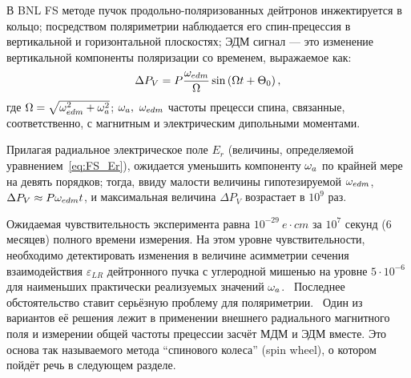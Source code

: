 В BNL FS методе пучок продольно-поляризованных
дейтронов инжектируется в кольцо; посредством поляриметрии наблюдается
его спин-прецессия в вертикальной и горизонтальной плоскостях; ЭДМ
сигнал --- это изменение вертикальной компоненты поляризации со
временем, выражаемое как:~\cite[стр.~8]{BNL:Deuteron2008}
\begin{equation}
  \Delta P_V = P\frac{\w_{edm}}{\W}\sin\bkt{\W t + \Theta_0},
\end{equation}
где $\Omega = \sqrt{\omega_{edm}^2 + \omega_a^2}$; $\omega_a,~\omega_{edm}$ частоты прецесси спина,
связанные, соответственно, с магнитным и электрическим дипольными моментами.

Прилагая радиальное электрическое поле $E_r$ (величины, определяемой уравнением~\eqref{eq:FS_Er}), ожидается
уменьшить компоненту $\omega_a$ по крайней мере на девять порядков; тогда, ввиду
малости величины гипотезируемой $\omega_{edm}$, ${\Delta P_V\approx P\omega_{edm} t}$, 
и максимальная величина $\Delta P_V$ возрастает в $10^9$ раз.

Ожидаемая чувствительность эксперимента равна $10^{-29}~e\cdot cm$ за $10^7$
секунд (6 месяцев) полного времени измерения. На этом уровне
чувствительности, необходимо детектировать изменения в величине 
асимметрии сечения взаимодействия $\varepsilon_{LR}$  
дейтронного пучка с углеродной мишенью на уровне 
$5\cdot10^{-6}$ для наименьших практически реализуемых значений
$\omega_a$.~\cite[стр.~18]{BNL:Deuteron2008} Последнее обстоятельство
ставит серьёзную проблему для поляриметрии.~\cite[стр.~6]{Mane:SpinWheel} Один
из вариантов её решения лежит в применении внешнего радиального
магнитного поля и измерении общей частоты прецессии засчёт МДМ и ЭДМ
вместе. Это основа так называемого метода ``спинового колеса'' (spin wheel), 
о котором пойдёт речь в следующем разделе. 

